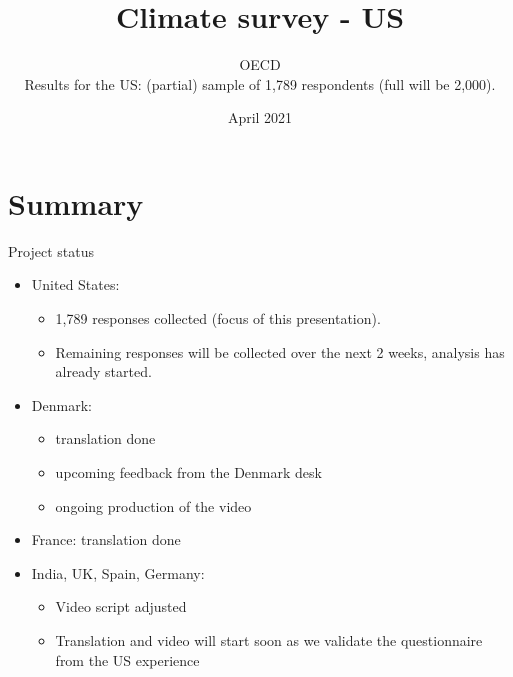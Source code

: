 \documentclass[aspectratio=169,9pt,dvipsnames]{beamer}
\title[Climate survey - US]{\huge Climate survey - US}
\author[OECD]{OECD \\ \vspace{1cm}
     Results for the US: (partial) sample of 1,789 respondents (full will be 2,000).}%
\date[\insertsection]{April 2021}
\begin{document}
	\begin{frame}

\titlepage

	\end{frame}

	
\AtBeginPart{\frame{\partpage}}

\section{Summary}
\begin{frame}{Project status}
\begin{itemize}
\item United States:
	\begin{itemize}
	\item 1,789 responses collected (focus of this presentation).
	\item Remaining responses will be collected over the next 2 weeks, analysis has already started.
	\end{itemize}
\item Denmark: 
	\begin{itemize}
	\item translation done
	\item upcoming feedback from the Denmark desk
	\item ongoing production of the video
	\end{itemize}
\item  France: translation done

\item India, UK, Spain, Germany:

\begin{itemize}
	\item Video script adjusted
	\item Translation and video will start soon as we validate the questionnaire from the US experience
\end{itemize}

\end{itemize}
\end{frame}
\end{document}
